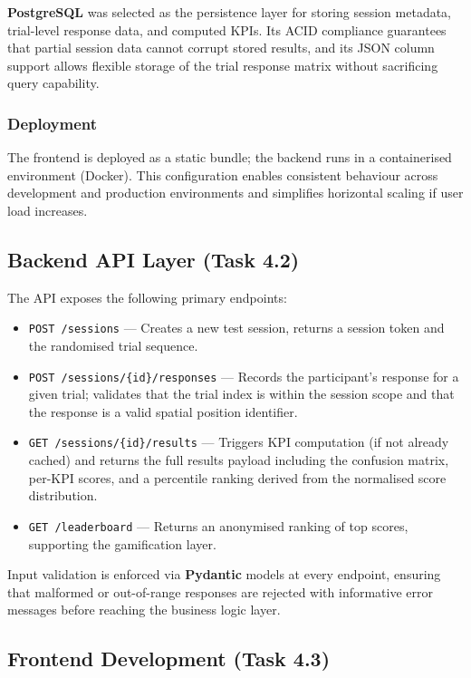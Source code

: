 \textbf{PostgreSQL} was selected as the persistence layer for storing session metadata,
trial-level response data, and computed KPIs. Its ACID compliance guarantees that partial
session data cannot corrupt stored results, and its JSON column support allows flexible
storage of the trial response matrix without sacrificing query capability.

\subsubsection{Deployment}

The frontend is deployed as a static bundle; the backend runs in a containerised
environment (Docker). This configuration enables consistent behaviour across development
and production environments and simplifies horizontal scaling if user load increases.

\subsection{Backend API Layer (Task 4.2)}

The API exposes the following primary endpoints:

\begin{itemize}
    \item \texttt{POST /sessions} — Creates a new test session, returns a session token
    and the randomised trial sequence.
    \item \texttt{POST /sessions/\{id\}/responses} — Records the participant's response
    for a given trial; validates that the trial index is within the session scope and that
    the response is a valid spatial position identifier.
    \item \texttt{GET /sessions/\{id\}/results} — Triggers KPI computation (if not already
    cached) and returns the full results payload including the confusion matrix, per-KPI
    scores, and a percentile ranking derived from the normalised score distribution.
    \item \texttt{GET /leaderboard} — Returns an anonymised ranking of top scores,
    supporting the gamification layer.
\end{itemize}

Input validation is enforced via \textbf{Pydantic} models at every endpoint, ensuring
that malformed or out-of-range responses are rejected with informative error messages
before reaching the business logic layer.

\subsection{Frontend Development (Task 4.3)}

